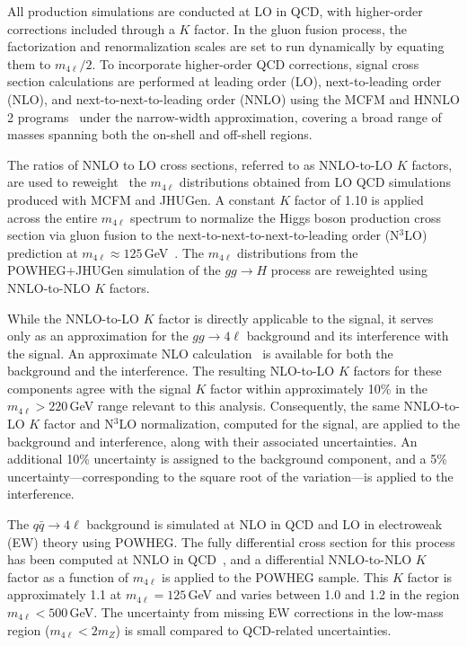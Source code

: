 
All \offshell production simulations are conducted at LO in QCD, with higher-order corrections 
included through a $K$ factor. In the gluon fusion process, the factorization and renormalization scales are set to run dynamically by equating them to $m_{4\ell}/2$. To incorporate higher-order QCD corrections, signal cross section calculations are performed at leading order (LO), next-to-leading order (NLO), and next-to-next-to-leading order (NNLO) using the MCFM and HNNLO 2 programs~\cite{Catani:2007vq,Grazzini:2008tf,Grazzini:2013mca} under the narrow-width approximation, covering a broad range of masses spanning both the on-shell and off-shell regions.

The ratios of NNLO to LO cross sections, referred to as NNLO-to-LO $K$ factors, are used to reweight~\cite{deFlorian:2016spz} the $m_{4\ell}$ distributions obtained from LO QCD simulations produced with MCFM and JHUGen. A constant $K$ factor of 1.10 is applied across the entire $m_{4\ell}$ spectrum to normalize the Higgs boson production cross section via gluon fusion to the next-to-next-to-next-to-leading order (N$^3$LO) prediction at $m_{4\ell} \approx 125$\,GeV~\cite{deFlorian:2016spz}. The $m_{4\ell}$ distributions from the POWHEG+JHUGen simulation of the $gg \to H$ process are reweighted using NNLO-to-NLO $K$ factors.

While the NNLO-to-LO $K$ factor is directly applicable to the signal, it serves only as an approximation for the $gg \to 4\ell$ background and its interference with the signal. An approximate NLO calculation~\cite{Caola:2015psa,Melnikov:2015laa,Campbell:2016ivq,Caola:2016trd} is available for both the background and the interference. The resulting NLO-to-LO $K$ factors for these components agree with the signal $K$ factor within approximately 10\% in the $m_{4\ell} > 220$\,GeV range relevant to this analysis. Consequently, the same NNLO-to-LO $K$ factor and N$^3$LO normalization, computed for the signal, are applied to the background and interference, along with their associated uncertainties. An additional 10\% uncertainty is assigned to the background component, and a 5\% uncertainty—corresponding to the square root of the variation—is applied to the interference.

The $q\bar{q} \to 4\ell$ background is simulated at NLO in QCD and LO in electroweak (EW) theory using POWHEG. The fully differential cross section for this process has been computed at NNLO in QCD~\cite{Grazzini:2015hta}, and a differential NNLO-to-NLO $K$ factor as a function of $m_{4\ell}$ is applied to the POWHEG sample. This $K$ factor is approximately 1.1 at $m_{4\ell} = 125$\,GeV and varies between 1.0 and 1.2 in the region $m_{4\ell} < 500$\,GeV. The uncertainty from missing EW corrections in the low-mass region ($m_{4\ell} < 2m_{Z}$) is small compared to QCD-related uncertainties.

